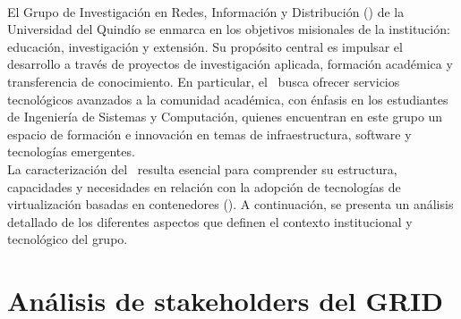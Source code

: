 \label{cap:caracterizacionGRID}
\mbox{}\\
El Grupo de Investigación en Redes, Información y Distribución (\GRID) de la Universidad del Quindío se enmarca en los objetivos misionales de la institución: educación, investigación y extensión. Su propósito central es impulsar el desarrollo a través de proyectos de investigación aplicada, formación académica y transferencia de conocimiento. En particular, el \GRID\ busca ofrecer servicios tecnológicos avanzados a la comunidad académica, con énfasis en los estudiantes de Ingeniería de Sistemas y Computación, quienes encuentran en este grupo un espacio de formación e innovación en temas de infraestructura, software y tecnologías emergentes.\\
La caracterización del \GRID\ resulta esencial para comprender su estructura, capacidades y necesidades en relación con la adopción de tecnologías de virtualización basadas en contenedores (\VBC). A continuación, se presenta un análisis detallado de los diferentes aspectos que definen el contexto institucional y tecnológico del grupo.

\section{Análisis de stakeholders del GRID}

